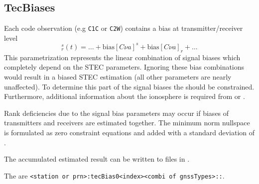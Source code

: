 \subsection{TecBiases}\label{gnssParametrizationType:tecBiases}
Each code observation (e.g \verb|C1C| or \verb|C2W|) contains a bias at transmitter/receiver level
\begin{equation}
  [C\nu a]_r^s(t) = \dots + \text{bias}[C\nu a]^s + \text{bias}[C\nu a]_r + \ldots
\end{equation}
This parametrization represents the linear combination of signal biases
which completely depend on the STEC parameters. Ignoring these bias combinations would result
in a biased STEC estimation (all other parameters are nearly unaffected).
To determine this part of the signal biases
the  should be constrained.
Furthermore, additional information about the ionosphere is required from
 or
.

Rank deficiencies due to the signal bias parameters may occur if biases of
transmitters and receivers are estimated together.
The minimum norm nullspace is formulated as zero constraint equations and added with
a standard deviation of .

The accumulated estimated result can be written to files in
.

The  are \verb|<station or prn>:tecBias0<index><combi of gnssTypes>::|.


